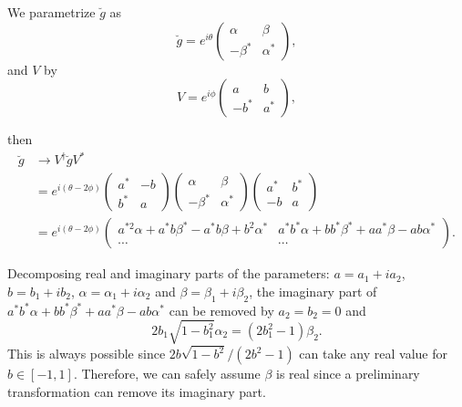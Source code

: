 \documentclass[aps, prb, showpacs, twocolumn, notitlepage, superscriptaddress]{revtex4-1}
\begin{document}
We parametrize $\breve{g}$ as
\begin{equation}
\breve{g}=e^{i\theta}\left(\begin{array}{cc}
\alpha & \beta\\
-\beta^{*} & \alpha^{*}
\end{array}\right),
\end{equation}
and $V$ by
\begin{equation}
V=e^{i\phi}\left(\begin{array}{cc}
a & b\\
-b^{*} & a^{*}
\end{array}\right),
\end{equation}
\begin{widetext}
then 
\begin{align}
\breve{g} & \to V^{\dagger}\breve{g}V^{*}\\
 & =e^{i(\theta-2\phi)}\left(\begin{array}{cc}
a^{*} & -b\\
b^{*} & a
\end{array}\right)\left(\begin{array}{cc}
\alpha & \beta\\
-\beta^{*} & \alpha^{*}
\end{array}\right)\left(\begin{array}{cc}
a^{*} & b^{*}\\
-b & a
\end{array}\right)\\
 & =e^{i(\theta-2\phi)}\left(\begin{array}{cc}
a^{*2}\alpha+a^{*}b\beta^{*}-a^{*}b\beta+b^{2}\alpha^{*} & a^{*}b^{*}\alpha+bb^{*}\beta^{*}+aa^{*}\beta-ab\alpha^{*}\\
\cdots & \cdots
\end{array}\right).
\end{align}
\end{widetext}
Decomposing real and imaginary parts of the parameters: $a=a_{1}+ia_{2}$, $b=b_{1}+ib_{2}$, $\alpha=\alpha_{1}+i\alpha_{2}$
and $\beta=\beta_{1}+i\beta_{2}$, the imaginary part
of $a^{*}b^{*}\alpha+bb^{*}\beta^{*}+aa^{*}\beta-ab\alpha^{*}$ can be removed by $a_2=b_2=0$ and 
\begin{equation}
2b_1\sqrt{1-b_1^{2}}\alpha_{2} =(2b_1^{2}-1)\beta_{2}.
\end{equation}
This is always possible since $2b\sqrt{1-b^{2}}/(2b^{2}-1)$ can take
any real value for $b\in[-1,1]$. Therefore, we can safely assume
$\beta$ is real since a preliminary transformation can remove its
imaginary part. 
\end{document}
